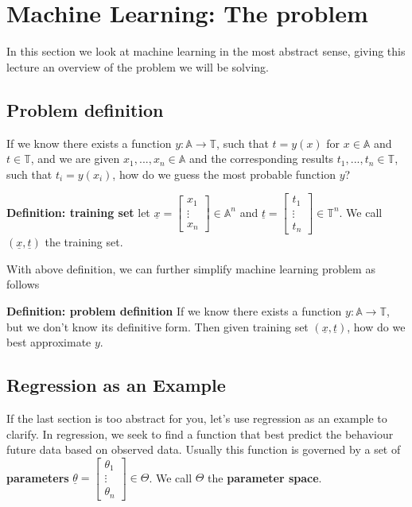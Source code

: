 
\section{Machine Learning: The problem}

In this section we look at machine learning in the most abstract sense, giving this lecture an overview of the problem we will be solving.

\subsection{Problem definition}
If we know there exists a function $y: \mathbb{A} \to \mathbb{T}$, such that $t = y(x)$ for $x \in \mathbb{A}$ and $t \in  \mathbb{T}$, and we are given $x_1, ..., x_n \in \mathbb{A}$ and the corresponding results $t_1, ..., t_n \in \mathbb{T}$, such that $t_i = y(x_i)$, how do we guess the most probable function $y$?

\textbf{Definition: training set} let $ \underline{x} = \begin{bmatrix} x_1 \\ \vdots \\ x_n \end{bmatrix} \in \mathbb{A}^n$ and $ \underline{t} = \begin{bmatrix} t_1 \\ \vdots \\ t_n \end{bmatrix} \in \mathbb{T}^n$. We call $(\underline{x}, \underline{t})$ the training set.

With above definition, we can further simplify machine learning problem as follows

\textbf{Definition: problem definition} If we know there exists a function $y: \mathbb{A} \to  \mathbb{T}$, but we don't know its definitive form. Then given training set $(\underline{x}, \underline{t})$, how do we best approximate $y$.

\subsection{Regression as an Example}
If the last section is too abstract for you, let's use regression as an example to clarify. In regression, we seek to find a function that best predict the behaviour future data based on observed data. Usually this function is governed by a set of \textbf{parameters} $\underline{\theta} = \begin{bmatrix} \theta_1 \\ \vdots \\ \theta_n \end{bmatrix} \in \Theta$. We call $\Theta$ the \textbf{parameter space}.

